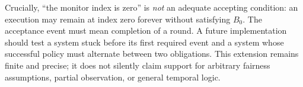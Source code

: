 Crucially, ``the monitor index is zero'' is \emph{not} an adequate accepting
condition: an execution may remain at index zero forever without satisfying
$B_0$. The acceptance event must mean completion of a round. A future
implementation should test a system stuck before its first required event and
a system whose successful policy must alternate between two obligations.
This extension remains finite and precise; it does not silently claim support
for arbitrary fairness assumptions, partial observation, or general temporal
logic.
